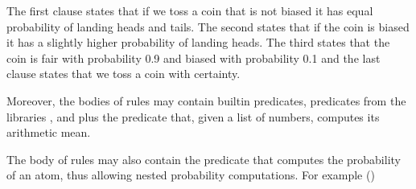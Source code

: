 \documentclass[letterpaper,10pt,english]{sphinxmanual}
\begin{document}
\begin{sphinxVerbatim}[commandchars=\\\{\}]
   

   

  

\end{sphinxVerbatim}

\sphinxAtStartPar
The first clause states that if we toss a coin that is not biased it has equal probability of landing heads and
tails.
The second states that if the coin is biased it has a slightly higher probability of landing heads.
The third states that the coin is fair with probability 0.9 and biased with probability 0.1 and the last clause
states that we toss a coin with certainty.

\sphinxAtStartPar
Moreover, the bodies of rules may contain built\sphinxhyphen{}in predicates, predicates from the libraries ,
 and  plus the predicate 
that, given a list of numbers, computes its arithmetic mean.

\sphinxAtStartPar
The body of rules may also contain the predicate  that computes the probability of an atom,
thus allowing nested probability computations.
For example ()

\begin{sphinxVerbatim}[commandchars=\\\{\}]
      
\end{sphinxVerbatim}
\end{document}
